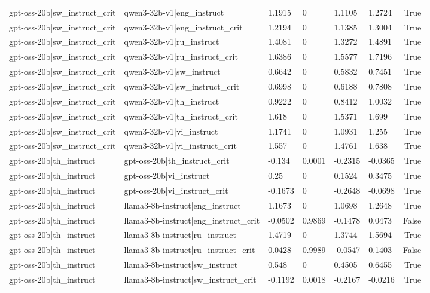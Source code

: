 \begin{table}
\begin{tabular}{llllllr}
gpt-oss-20b|sw_instruct_crit & qwen3-32b-v1|eng_instruct & 1.1915 & 0 & 1.1105 & 1.2724 & True \\
gpt-oss-20b|sw_instruct_crit & qwen3-32b-v1|eng_instruct_crit & 1.2194 & 0 & 1.1385 & 1.3004 & True \\
gpt-oss-20b|sw_instruct_crit & qwen3-32b-v1|ru_instruct & 1.4081 & 0 & 1.3272 & 1.4891 & True \\
gpt-oss-20b|sw_instruct_crit & qwen3-32b-v1|ru_instruct_crit & 1.6386 & 0 & 1.5577 & 1.7196 & True \\
gpt-oss-20b|sw_instruct_crit & qwen3-32b-v1|sw_instruct & 0.6642 & 0 & 0.5832 & 0.7451 & True \\
gpt-oss-20b|sw_instruct_crit & qwen3-32b-v1|sw_instruct_crit & 0.6998 & 0 & 0.6188 & 0.7808 & True \\
gpt-oss-20b|sw_instruct_crit & qwen3-32b-v1|th_instruct & 0.9222 & 0 & 0.8412 & 1.0032 & True \\
gpt-oss-20b|sw_instruct_crit & qwen3-32b-v1|th_instruct_crit & 1.618 & 0 & 1.5371 & 1.699 & True \\
gpt-oss-20b|sw_instruct_crit & qwen3-32b-v1|vi_instruct & 1.1741 & 0 & 1.0931 & 1.255 & True \\
gpt-oss-20b|sw_instruct_crit & qwen3-32b-v1|vi_instruct_crit & 1.557 & 0 & 1.4761 & 1.638 & True \\
gpt-oss-20b|th_instruct & gpt-oss-20b|th_instruct_crit & -0.134 & 0.0001 & -0.2315 & -0.0365 & True \\
gpt-oss-20b|th_instruct & gpt-oss-20b|vi_instruct & 0.25 & 0 & 0.1524 & 0.3475 & True \\
gpt-oss-20b|th_instruct & gpt-oss-20b|vi_instruct_crit & -0.1673 & 0 & -0.2648 & -0.0698 & True \\
gpt-oss-20b|th_instruct & llama3-8b-instruct|eng_instruct & 1.1673 & 0 & 1.0698 & 1.2648 & True \\
gpt-oss-20b|th_instruct & llama3-8b-instruct|eng_instruct_crit & -0.0502 & 0.9869 & -0.1478 & 0.0473 & False \\
gpt-oss-20b|th_instruct & llama3-8b-instruct|ru_instruct & 1.4719 & 0 & 1.3744 & 1.5694 & True \\
gpt-oss-20b|th_instruct & llama3-8b-instruct|ru_instruct_crit & 0.0428 & 0.9989 & -0.0547 & 0.1403 & False \\
gpt-oss-20b|th_instruct & llama3-8b-instruct|sw_instruct & 0.548 & 0 & 0.4505 & 0.6455 & True \\
gpt-oss-20b|th_instruct & llama3-8b-instruct|sw_instruct_crit & -0.1192 & 0.0018 & -0.2167 & -0.0216 & True \\

\end{tabular}
\end{table}
